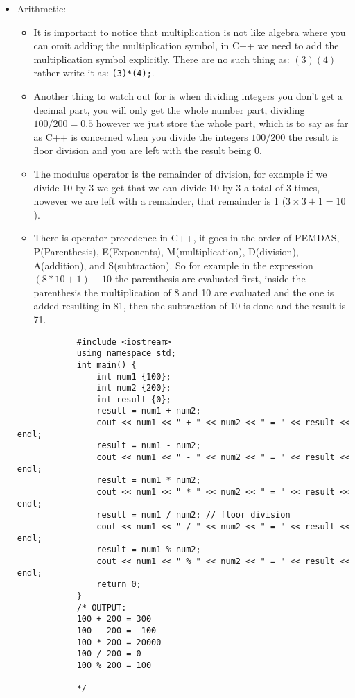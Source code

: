 \begin{itemize}
    \item Arithmetic: 
        \begin{itemize}
            \item It is important to notice that multiplication is not like algebra where you can omit adding the multiplication symbol, in C++ we need to add the multiplication symbol explicitly. There are no such thing as: $(3)(4)$ rather write it as: \texttt{(3)*(4);}.
            \item Another thing to watch out for is when dividing integers you don't get a decimal part, you will only get the whole number part, dividing $100/200=0.5$ however we just store the whole part, which is to say as far as C++ is concerned when you divide the integers $100/200$ the result is floor division and you are left with the result being $0$.
            \item The modulus operator is the remainder of division, for example if we divide 10 by 3 we get that we can divide 10 by 3 a total of 3 times, however we are left with a remainder, that remainder is 1 ($3\times 3 + 1 = 10$).
            \item There is operator precedence in C++, it goes in the order of PEMDAS, P(Parenthesis), E(Exponents), M(multiplication), D(division), A(addition), and S(subtraction). So for example in the expression $(8*10+1)-10$ the parenthesis are evaluated first, inside the parenthesis the multiplication of 8 and 10 are evaluated and the one is added resulting in 81, then the subtraction of 10 is done and the result is 71.
        \end{itemize}
        \begin{verbatim}
            #include <iostream>
            using namespace std;
            int main() {
                int num1 {100};
                int num2 {200};
                int result {0};
                result = num1 + num2;
                cout << num1 << " + " << num2 << " = " << result << endl;
                result = num1 - num2;
                cout << num1 << " - " << num2 << " = " << result << endl;
                result = num1 * num2;
                cout << num1 << " * " << num2 << " = " << result << endl;
                result = num1 / num2; // floor division
                cout << num1 << " / " << num2 << " = " << result << endl; 
                result = num1 % num2;
                cout << num1 << " % " << num2 << " = " << result << endl;
                return 0;
            }
            /* OUTPUT:
            100 + 200 = 300
            100 - 200 = -100
            100 * 200 = 20000
            100 / 200 = 0
            100 % 200 = 100

            */
        \end{verbatim}
\end{itemize}


